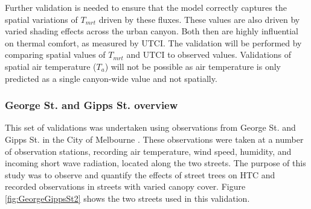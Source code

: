 \documentclass[final,3p,times,authoryear]{elsarticle}
\begin{document}
Further validation is needed to ensure that the model correctly captures the spatial variations of $T_{mrt}$ driven by these fluxes. These values are also driven by varied shading effects across the urban canyon. Both then are highly influential on thermal comfort, as measured by UTCI. The validation will be performed by comparing spatial values of $T_{mrt}$ and UTCI to observed values. Validations of spatial air temperature ($T_{a}$) will not be possible as air temperature is only predicted as a single canyon-wide value and not spatially.

\subsubsection{George St. and Gipps St. overview}
This set of validations was undertaken using observations from George St. and Gipps St. in the City of Melbourne \citep{Coutts2015}. These observations were taken at a number of observation stations, recording air temperature, wind speed, humidity, and incoming short wave radiation, located along the two streets. The purpose of this study was to observe and quantify the effects of street trees on HTC and recorded observations in streets with varied canopy cover. Figure \ref{fig:GeorgeGippsSt2} shows the two streets used in this validation. 
\end{document}
